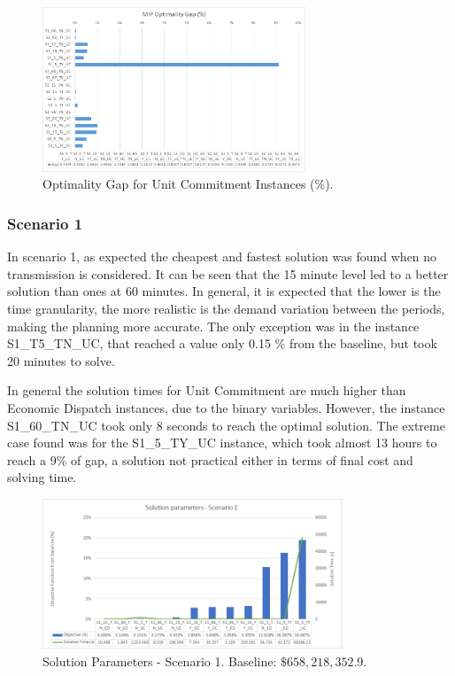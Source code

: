 \documentclass[12pt,LUDisStyle,twosided]{book}
\begin{document}
\begin{figure}[H] 
  \centering
	  \includegraphics[width=0.7\textwidth,keepaspectratio]{mipgap.png}
  \caption{Optimality Gap for Unit Commitment Instances (\%).}
  \label{fig:mipgap}
\end{figure}


\subsubsection{Scenario 1}
In scenario 1, as expected the cheapest and fastest solution was found when no transmission is considered. It can be seen that the 15 minute level led to a better solution than ones at 60 minutes. In general, it is expected that the lower is the time granularity, the more realistic is the demand variation between the periods, making the planning more accurate. The only exception was in the instance S1\_T5\_TN\_UC, that reached a value only 0.15 \% from the baseline, but took 20 minutes to solve. 

In general the solution times for Unit Commitment are much higher than Economic Dispatch instances, due to the binary variables. However, the instance S1\_60\_TN\_UC took only 8 seconds to reach the optimal solution. The extreme case found was for the S1\_5\_TY\_UC instance, which took almost 13 hours to reach a 9\% of gap, a solution not practical either in terms of final cost and solving time.

\begin{figure}[H] 
  \centering
	  \includegraphics[width=0.8\textwidth,height=\textheight,keepaspectratio]{SolutionParametersS1.png}
  \caption{Solution Parameters - Scenario 1. Baseline: $\$658,218,352.9$.}
  \label{fig:solutionparameterss1}
\end{figure}
\end{document}
